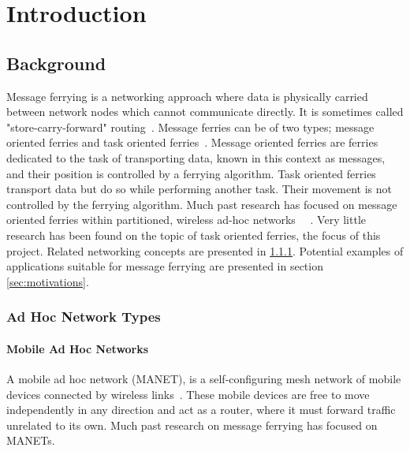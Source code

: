 
\chapter{Introduction} 

\section{Background}
Message ferrying is a networking approach where data is physically carried between network nodes which cannot communicate directly.
It is sometimes called "store-carry-forward" routing~\cite{Routing}.
Message ferries can be of two types; message oriented ferries and task oriented ferries~\cite{hybrid}.
Message oriented ferries are ferries dedicated to the task of transporting data, known in this context as messages, and their position is controlled by a ferrying algorithm.  
Task oriented ferries transport data but do so while performing another task.
Their movement is not controlled by the ferrying algorithm.
Much past research has focused on message oriented ferries within partitioned, wireless ad-hoc networks~\cite{Routing}~\cite{adhocmsgferry}	.
Very little research has been found on the topic of task oriented ferries, the focus of this project.
Related networking concepts are presented in \ref{sec:net_types}.
Potential examples of applications suitable for message ferrying are presented in section \ref{sec:motivations}.


\subsection{Ad Hoc Network Types}
\label{sec:net_types}

\subsubsection{Mobile Ad Hoc Networks}
A mobile ad hoc network (MANET),  is a self-configuring mesh network of mobile devices connected by wireless links~\cite{book1}.
These mobile devices are free to move independently in any direction and act as a router, where it must forward traffic unrelated to its own.
Much past research on message ferrying has focused on MANETs.

